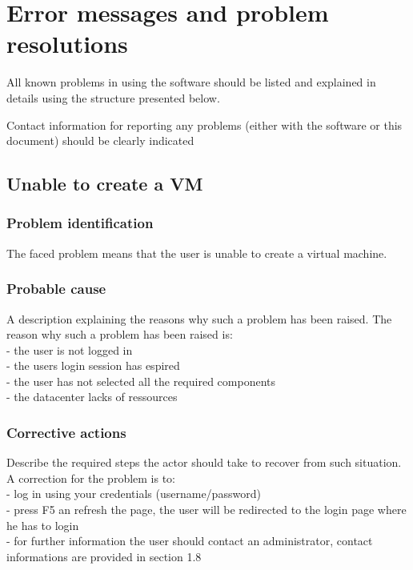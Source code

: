 
\chapter{Error messages and problem resolutions}
\label{chap:error_messages}

All known problems in using the software should be listed and explained in
details using the structure presented below.

Contact information for reporting any problems (either with the software or
this document) should be clearly indicated


\section{Unable to create a VM}

\subsection{Problem identification}
The faced problem means that the user is unable to create a virtual machine.

\subsection{Probable cause}
A description explaining the reasons why such a problem has been raised.
The reason why such a problem has been raised is:\\
- the user is not logged in\\
- the users login session has espired\\
- the user has not selected all the required components\\
- the datacenter lacks of ressources\\

\subsection{Corrective actions}
Describe the required steps the actor should take to recover from such situation.
A correction for the problem is to:\\
- log in using your credentials (username/password)\\
- press F5 an refresh the page, the user will be redirected to the login page
where he has to login\\
- for further information the user should contact an administrator, contact
informations are provided in section 1.8
